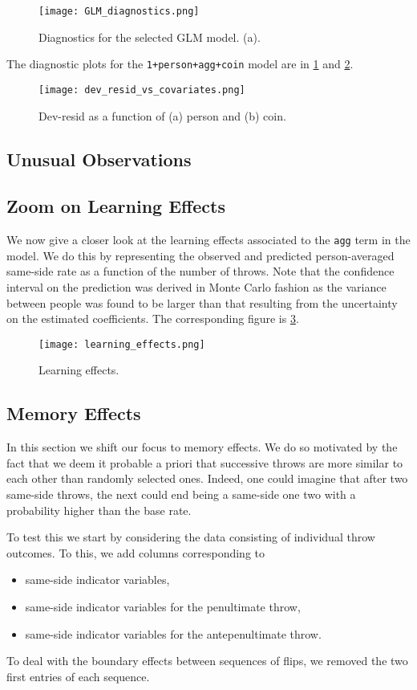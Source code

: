 \documentclass[a4paper, 12pt,oneside]{article}
\begin{document}
			\begin{figure}[htb]
				\centering
				\texttt{[image: GLM\_diagnostics.png]}
				\caption{Diagnostics for the selected GLM model. (a).}
				\label{fig:glm-diagnostic}
			\end{figure}
			The diagnostic plots for the \texttt{1+person+agg+coin} model are in \ref{fig:glm-diagnostic} and \ref{fig:dev-resid-vs-covariates}. 
			\begin{figure}[htb]
				\centering
				\texttt{[image: dev\_resid\_vs\_covariates.png]}
				\caption{Dev-resid as a function of (a) person and (b) coin.}
				\label{fig:dev-resid-vs-covariates}
			\end{figure}	
		\subsection{Unusual Observations}

		\subsection{Zoom on Learning Effects}
			We now give a closer look at the learning effects associated to the \texttt{agg} term in the model. We do this by representing the observed and predicted person-averaged same-side rate as a function of the number of throws.  Note that the confidence interval on the prediction was derived in Monte Carlo fashion as the variance between people was found to be larger than that resulting from the uncertainty on the estimated coefficients. 
			The corresponding figure is \ref{fig:learning-effects}. 
			\begin{figure}[htb]
				\centering
				\texttt{[image: learning\_effects.png]}
				\caption{Learning effects.}
				\label{fig:learning-effects}
			\end{figure}
		\subsection{Memory Effects}
		In this section we shift our focus to memory effects. We do so motivated by the fact that we deem it probable a priori that successive throws are more similar to each other than randomly selected ones. Indeed, one could imagine that after two same-side throws, the next could end being a same-side one two with a probability higher than the base rate. 
		
		To test this we start by considering the data consisting of individual throw outcomes. To this, we add columns corresponding to 
		\begin{itemize}
			\item same-side indicator variables,
			\item same-side indicator variables for the penultimate throw,
			\item same-side indicator variables for the antepenultimate throw.
		\end{itemize}
		To deal with the boundary effects between sequences of flips, we removed the two first entries of each sequence. 
		
\end{document}
